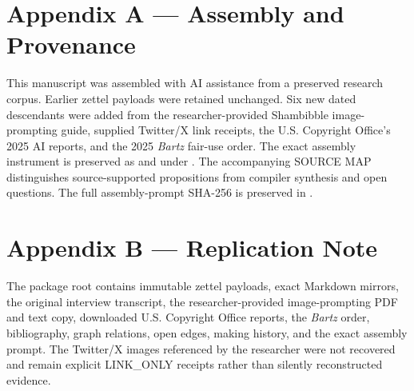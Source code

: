\documentclass[11pt]{article}
\begin{document}
\newpage
\section*{Appendix A — Assembly and Provenance}
This manuscript was assembled with AI assistance from a preserved research corpus. Earlier zettel payloads were retained unchanged. Six new dated descendants were added from the researcher-provided Shambibble image-prompting guide, supplied Twitter/X link receipts, the U.S. Copyright Office's 2025 AI reports, and the 2025 \emph{Bartz} fair-use order. The exact assembly instrument is preserved as  and under . The accompanying SOURCE MAP distinguishes source-supported propositions from compiler synthesis and open questions. The full assembly-prompt SHA-256 is preserved in .

\section*{Appendix B — Replication Note}
The package root contains immutable zettel payloads, exact Markdown mirrors, the original interview transcript, the researcher-provided image-prompting PDF and text copy, downloaded U.S. Copyright Office reports, the \emph{Bartz} order, bibliography, graph relations, open edges, making history, and the exact assembly prompt. The Twitter/X images referenced by the researcher were not recovered and remain explicit LINK\_ONLY receipts rather than silently reconstructed evidence.
\end{document}
